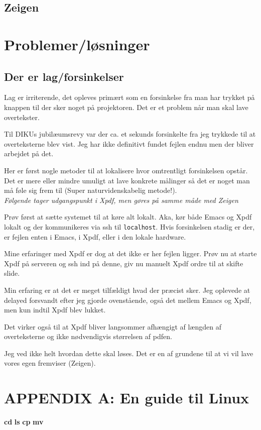 \documentclass[10pt,a4paper,danish]{article}
\begin{document}
\subsection{Zeigen}

\section{Problemer/løsninger}
\subsection{Der er lag/forsinkelser}
Lag er irriterende, det opleves primært som en forsinkelse fra man har trykket
på knappen til der sker noget på projektoren. Det er et problem når man skal
lave overtekster.

Til DIKUs jubilæumsrevy var der ca. et sekunds forsinkelte fra jeg trykkede til
at overteksterne blev vist. Jeg har ikke definitivt fundet fejlen endnu men der
bliver arbejdet på det.

Her er først nogle metoder til at lokalisere hvor omtrentligt forsinkelsen
opstår.
Det er mere eller mindre umuligt at lave konkrete målinger så det er noget man
må føle sig frem til (Super naturvidenskabelig metode!).\\
\textit{Følgende tager udgangspunkt i Xpdf, men gøres på samme måde med Zeigen}

Prøv først at sætte systemet til at køre alt lokalt. Aka, kør både Emacs og Xpdf
lokalt og der kommunikeres via ssh til \texttt{localhost}. Hvis forsinkelsen
stadig er der, er fejlen enten i Emacs, i Xpdf, eller i den lokale
hardware.

Mine erfaringer med Xpdf er dog at det ikke er her fejlen ligger.
Prøv nu at starte Xpdf på serveren og ssh ind på denne, giv nu manuelt Xpdf
ordre til at skifte slide.

Min erfaring er at det er meget tilfældigt hvad der præcist sker. Jeg oplevede
at delayed forsvandt efter jeg gjorde ovenstående, også det mellem Emacs og
Xpdf, men kun indtil Xpdf blev lukket.

Det virker også til at Xpdf bliver langsommer afhængigt af længden af
overteksterne og ikke nødvendigvis størrelsen af pdfen.

Jeg ved ikke helt hvordan dette skal løses.
Det er en af grundene til at vi vil lave vores egen fremviser (Zeigen).

\section{APPENDIX A: En guide til Linux}
\textbf{cd}
\textbf{ls}
\textbf{cp}
\textbf{mv}
\end{document}
